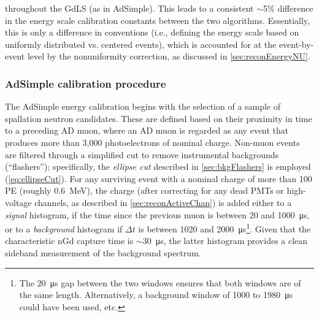 \documentclass[../thesis.tex]{subfiles}
\begin{document}
throughout the GdLS (as in AdSimple). This leads to a consistent $\sim$5\% difference in the energy scale calibration constants between the two algorithms. Essentially, this is only a difference in conventions (i.e., defining the energy scale based on uniformly distributed vs. centered events), which is accounted for at the event-by-event level by the nonuniformity correction, as discussed in \autoref{sec:reconEnergyNU}.

\begin{comment}
  A sample enriched in such neutrons is obtained by selecting events in a time window (XXX define) immediately after AD muons (XXX of what minimum energy?). These captures are distributed uniformly throughout the GdLS, much like IBDs. The nGd capture peak in the charge distribution is fit to a Gaussian (XXX crystal ball?), and the location of the peak is defined as corresponding to 7.95 MeV (XXX) 8.0 MeV according to doc-7334 (AdSimple). This energy scale is stored in the offline database, valid for the period in which the neutrons were collected. In the near (far) halls, it takes XXX (YYY) days to obtain the necessary statistics; this is thus the time-resolution of the energy scale, which is sufficient, given that the light yield changes very slowly, declining by some 1\% to 1.5\% per year.
  
24 hours
\end{comment}

\begin{comment}
  Figure out exactly what energy is pegged by AdSimple and AdScaled. 7.95 MeV? Discuss differences (e.g. due to muon afterpulsing?)
  5x15min Co60
  4x10hour AmC
\end{comment}

\subsubsection{AdSimple calibration procedure}
\label{sec:reconEnergyAdSimpleCalib}

The AdSimple energy calibration begins with the selection of a sample of spallation neutron candidates. These are defined based on their proximity in time to a preceding AD muon, where an AD muon is regarded as any event that produces more than 3,000 photoelectrons of nominal charge. Non-muon events are filtered through a simplified cut to remove instrumental backgrounds (``flashers''); specifically, the \emph{ellipse cut} described in \autoref{sec:bkgFlashers} is employed (\autoref{eq:ellipseCut}). For any surviving event with a nominal charge of more than 100 PE (roughly 0.6~MeV), the charge (after correcting for any dead PMTs or high-voltage channels, as described in \autoref{sec:reconActiveChan}) is added either to a \emph{signal} histogram, if the time since the previous muon is between 20 and \SI{1000}{\micro s}, or to a \emph{background} histogram if $\Delta t$ is between 1020 and \SI{2000}{\micro s}\footnote{The \SI{20}{\micro s} gap between the two windows ensures that both windows are of the same length. Alternatively, a background window of 1000 to \SI{1980}{\micro s} could have been used, etc.}. Given that the characteristic nGd capture time is $\sim$\SI{30}{\micro s}, the latter histogram provides a clean sideband measurement of the background spectrum.
\end{document}
